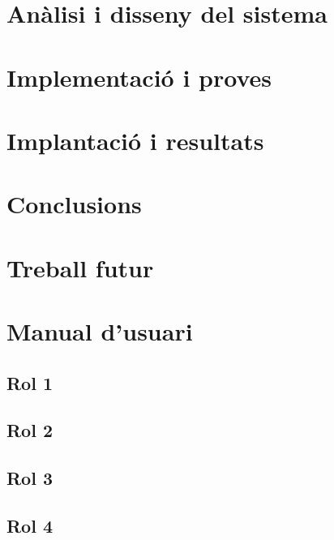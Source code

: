 \documentclass[a4paper,12pt]{ThesisStyle}
\begin{document}
\chapter{Anàlisi i disseny del sistema}
\label{cap:analisi}



\chapter{Implementació i proves}
\label{cap:implementacio}



\chapter{Implantació i resultats}
\label{cap:implantacio}



\chapter{Conclusions}
\label{cap:conclusions}



\chapter{Treball futur}
\label{cap:treball_futur}




\backmatter





%

\chapter*{Manual d'usuari}

\section*{Rol 1}



\section*{Rol 2}



\section*{Rol 3}



\section*{Rol 4}
\end{document}
